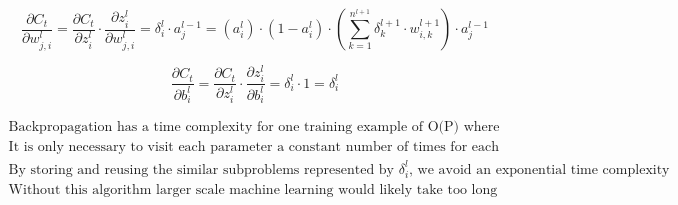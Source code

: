 \documentclass{article}
\begin{document}
\[
\frac{\partial C_{t}}{\partial w_{j,i}^{l}}=\frac{\partial C_{t}}{\partial z_{i}^{l}} \cdot \frac{\partial z_{i}^{l}}{\partial w_{j,i}^{l}}=\delta_{i}^{l} \cdot a_{j}^{l-1}=(a_{i}^{l}) \cdot (1 - a_{i}^{l}) \cdot (\sum_{k=1}^{n^{l+1}}\delta_{k}^{l+1} \cdot w_{i,k}^{l+1}) \cdot a_{j}^{l-1}
\]

\[
\frac{\partial C_{t}}{\partial b_{i}^{l}}=\frac{\partial C_{t}}{\partial z_{i}^{l}} \cdot \frac{\partial z_{i}^{l}}{\partial b_{i}^{l}}=\delta_{i}^{l} \cdot 1=\delta_{i}^{l}
\]

\begin{gather*}
\text{Backpropagation has a time complexity for one training example of O(P) where P is the number of weights and biases} \\[0.3em]
\text{It is only necessary to visit each parameter a constant number of times for each training example} \\[0.3em]
\text{By storing and reusing the similar subproblems represented by } \delta_{i}^{l}\text{, we avoid an exponential time complexity} \\[0.3em]
\text{Without this algorithm larger scale machine learning would likely take too long}
\end{gather*}
\end{document}
